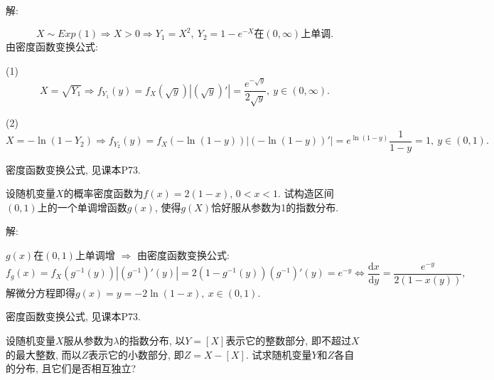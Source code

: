 \documentclass[standard]{ExBook}
\begin{document}
\begin{qitems}
\vspace{-5em}

    \begin{bbox}
解: 

$$X\sim Exp(1) \Longrightarrow X>0 \Longrightarrow Y_{1}=X^2,\ Y_{2}=1-e^{-X}\text{在}(0,\infty)上单调.$$
由密度函数变换公式:

(1) $$X=\sqrt{Y_1} \Longrightarrow f_{Y_1}(y)=f_{X}(\sqrt{y})|(\sqrt{y})'|=\displaystyle\frac{e^{-\sqrt{y}}}{2\sqrt{y}},\ y\in(0,\infty).$$

(2) $$X=-\ln(1-Y_2) \Longrightarrow f_{Y_2}(y)=f_{X}(-\ln(1-y))|(-\ln(1-y))'|=e^{\ln(1-y)}\frac{1}{1-y}=1,\ y\in(0,1).$$

\textcolor{themeColor}{\selectfont {} 密度函数变换公式, 见课本P73.}
    \end{bbox}

\vspace{-5em}

    \begin{bbox}
    \begin{shaded}
        \qitem
设随机变量$X$的概率密度函数为$f(x)=2(1-x)$, $0<x<1$. 试构造区间$(0, 1)$上的一个单调增函数$g(x)$, 使得$g(X)$恰好服从参数为1的指数分布.
    \end{shaded}
    \end{bbox}

\vspace{-5em}

    \begin{bbox}
解: 

$g(x)$在$(0,1)$上单调增 $\Longrightarrow$ 由密度函数变换公式:
$$f_{g}(x)=f_{X}\left(g^{-1}(y)\right)\left| \left(g^{-1}\right)'(y) \right|=2\left(1-g^{-1}(y)\right)\left(g^{-1}\right)'(y)=e^{-y} \Longleftrightarrow \frac{\mathrm{d}x}{\mathrm{d}y}=\frac{e^{-y}}{2(1-x(y))},$$
解微分方程即得$g(x)=y=-2\ln(1-x),\ x\in(0,1)$.

\textcolor{themeColor}{\selectfont {} 密度函数变换公式, 见课本P73.}
    \end{bbox}

\vspace{-5em}

    \begin{bbox}
    \begin{shaded}
        \qitem
设随机变量$X$服从参数为$\lambda$的指数分布, 以$Y=[X]$表示它的整数部分, 即不超过$X$的最大整数, 而以$Z$表示它的小数部分, 即$Z=X-[X]$. 试求随机变量$Y$和$Z$各自的分布, 且它们是否相互独立?
    \end{shaded}
    \end{bbox}


\end{qitems}
\end{document}
